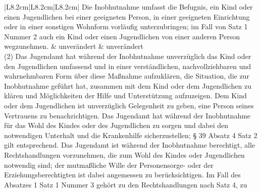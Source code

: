 \documentclass[10pt,a4paper,landscape]{article}
\begin{document}
\begin{longtable}{|L{8.2cm}|L{8.2cm}|L{8.2cm}|}
\hhline{|---|}
Die Inobhutnahme umfasst die Befugnis, ein  \newline Kind oder einen Jugendlichen bei einer  \newline geeigneten Person, in einer geeigneten  \newline Einrichtung oder in einer sonstigen  \newline Wohnform vorläufig unterzubringen; im Fall  \newline von Satz 1 Nummer 2 auch ein Kind oder  \newline einen Jugendlichen von einer anderen  \newline Person wegzunehmen. & unverändert & unverändert \\
\hhline{|---|}
(2) Das Jugendamt hat während der  \newline Inobhutnahme unverzüglich das Kind oder  \newline den Jugendlichen umfassend und in einer  \newline verständlichen, nachvollziehbaren und  \newline wahrnehmbaren Form über diese  \newline Maßnahme aufzuklären, die Situation, die  \newline zur Inobhutnahme geführt hat, zusammen  \newline mit dem Kind oder dem Jugendlichen zu  \newline klären und Möglichkeiten der Hilfe und  \newline Unterstützung aufzuzeigen. Dem Kind oder  \newline dem Jugendlichen ist unverzüglich  \newline Gelegenheit zu geben, eine Person seines  \newline Vertrauens zu benachrichtigen. Das  \newline Jugendamt hat während der Inobhutnahme  \newline für das Wohl des Kindes oder des  \newline Jugendlichen zu sorgen und dabei den  \newline notwendigen Unterhalt und die  \newline Krankenhilfe sicherzustellen; \S{} \textcolor{diffred}{39} Absatz 4  \newline Satz 2 gilt entsprechend. Das Jugendamt  \newline ist während der Inobhutnahme berechtigt,  \newline alle Rechtshandlungen vorzunehmen, die  \newline zum Wohl des Kindes oder Jugendlichen  \newline notwendig sind; der mutmaßliche Wille der  \newline Personensorge- oder der  \newline Erziehungsberechtigten ist dabei  \newline angemessen zu berücksichtigen. Im Fall  \newline des Absatzes 1 Satz 1 Nummer 3 gehört  \newline zu den Rechtshandlungen nach Satz 4, zu  
\end{longtable}
\end{document}
